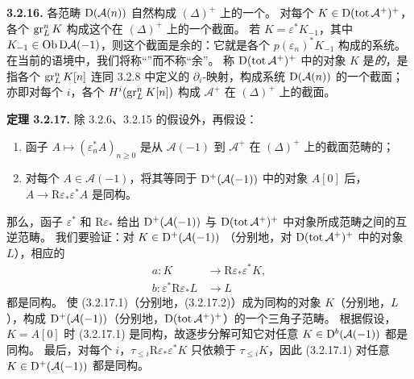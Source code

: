 \par\medskip\noindent\textbf{3.2.16.}
各范畴 $\mathrm{D}(\mathcal A(n))$ 自然构成 $(\Delta)^+$ 上的一个。
对每个 $K\in\mathrm{D}(\operatorname{tot}\mathcal A^+)^+$，各个 $\operatorname{gr}_L^nK$
构成这个在 $(\Delta)^+$ 上的一个截面。
若 $K=\varepsilon^*K_{-1}$，其中 $K_{-1}\in\operatorname{Ob}\mathrm{D}\mathcal A(-1)$，则这个截面是余的：它就是各个
$p(\varepsilon_n)^*K_{-1}$ 构成的系统。
在当前的语境中，我们将称“”而不称“余”。
称 $\mathrm{D}(\operatorname{tot}\mathcal A^+)^+$ 中的对象 $K$ 是\emph{的}，是指各个 $\operatorname{gr}_L^nK[n]$ 连同 3.2.8 中定义的 $\partial_i$-映射，构成系统
$\mathrm{D}(\mathcal A(n))$ 的一个截面；亦即对每个 $i$，各个
$H^i(\operatorname{gr}_L^nK[n])$ 构成 $\mathcal A^+$ 在 $(\Delta)^+$ 上的截面。

\par\medskip\noindent\textbf{定理 3.2.17.}
除 3.2.6、3.2.15 的假设外，再假设：
\begin{enumerate}[label=\(\alph*\)]
\item 函子 $A\longmapsto(\varepsilon_n^*A)_{n\geq0}$ 是从 $\mathcal A(-1)$
到 $\mathcal A^+$ 在 $(\Delta)^+$ 上的截面范畴的；
\item 对每个 $A\in\mathcal A(-1)$，将其等同于 $\mathrm{D}^+(\mathcal A(-1))$
中的对象 $A[0]$ 后，
$A\longrightarrow\mathrm R\varepsilon_*\varepsilon^*A$ 是同构。
\end{enumerate}
那么，函子 $\varepsilon^*$ 和 $\mathrm R\varepsilon_*$ 给出
$\mathrm{D}^+(\mathcal A(-1))$ 与 $\mathrm{D}(\operatorname{tot}\mathcal A^+)^+$ 中对象所成范畴之间的互逆范畴。
我们要验证：对 $K\in\mathrm{D}^+(\mathcal A(-1))$
（分别地，对 $\mathrm{D}(\operatorname{tot}\mathcal A^+)^+$ 中的对象 $L$），相应的
\begin{align*}
a:K&\longrightarrow\mathrm R\varepsilon_*\varepsilon^*K,
\tag{3.2.17.1}\\
b:\varepsilon^*\mathrm R\varepsilon_*L&\longrightarrow L
\tag{3.2.17.2}
\end{align*}
都是同构。
使 (3.2.17.1)（分别地，(3.2.17.2)）成为同构的对象 $K$（分别地，$L$），构成
$\mathrm{D}^+(\mathcal A(-1))$（分别地，$\mathrm{D}(\operatorname{tot}\mathcal A^+)^+$）的一个三角子范畴。
根据假设，$K=A[0]$ 时 (3.2.17.1) 是同构，故逐步分解可知它对任意
$K\in\mathrm{D}^b(\mathcal A(-1))$ 都是同构。
最后，对每个 $i$，$\tau_{\leq i}\mathrm R\varepsilon_*\varepsilon^*K$
只依赖于 $\tau_{\leq i}K$，因此 (3.2.17.1) 对任意
$K\in\mathrm{D}^+(\mathcal A(-1))$ 都是同构。

